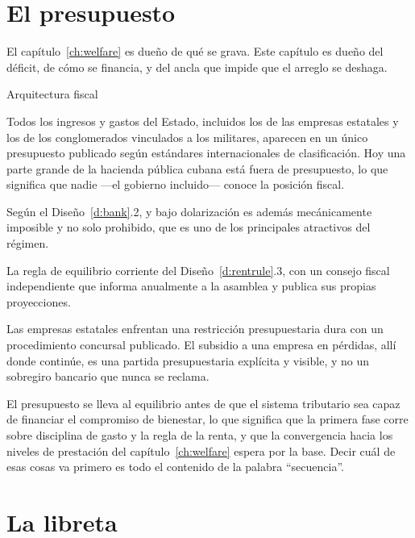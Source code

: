 \section{El presupuesto}

El capítulo~\ref{ch:welfare} es dueño de qué se grava. Este capítulo es dueño del
déficit, de cómo se financia, y del ancla que impide que el arreglo se deshaga.

\begin{design}{Arquitectura fiscal}
\label{d:fiscal}
\begin{rules}
 Todos los ingresos y gastos del Estado, incluidos los de las
empresas estatales y los de los conglomerados vinculados a los militares, aparecen en un
único presupuesto publicado según estándares internacionales de clasificación. Hoy una
parte grande de la hacienda pública cubana está fuera de presupuesto, lo que significa
que nadie ---el gobierno incluido--- conoce la posición fiscal.

 Según el Diseño~\ref{d:bank}.2, y bajo dolarización
es además mecánicamente imposible y no solo prohibido, que es uno de los principales
atractivos del régimen.

 La regla de equilibrio corriente del Diseño~\ref{d:rentrule}.3, con un
consejo fiscal independiente que informa anualmente a la asamblea y publica sus propias
proyecciones.

 Las empresas estatales enfrentan una
restricción presupuestaria dura con un procedimiento concursal publicado. El subsidio a
una empresa en pérdidas, allí donde continúe, es una partida presupuestaria explícita y
visible, y no un sobregiro bancario que nunca se reclama.

 El presupuesto se lleva al equilibrio antes de que el sistema
tributario sea capaz de financiar el compromiso de bienestar, lo que significa que la
primera fase corre sobre disciplina de gasto y la regla de la renta, y que la
convergencia hacia los niveles de prestación del capítulo~\ref{ch:welfare} espera por la
base. Decir cuál de esas cosas va primero es todo el contenido de la palabra
``secuencia''.
\end{rules}
\end{design}

\section{La libreta}

